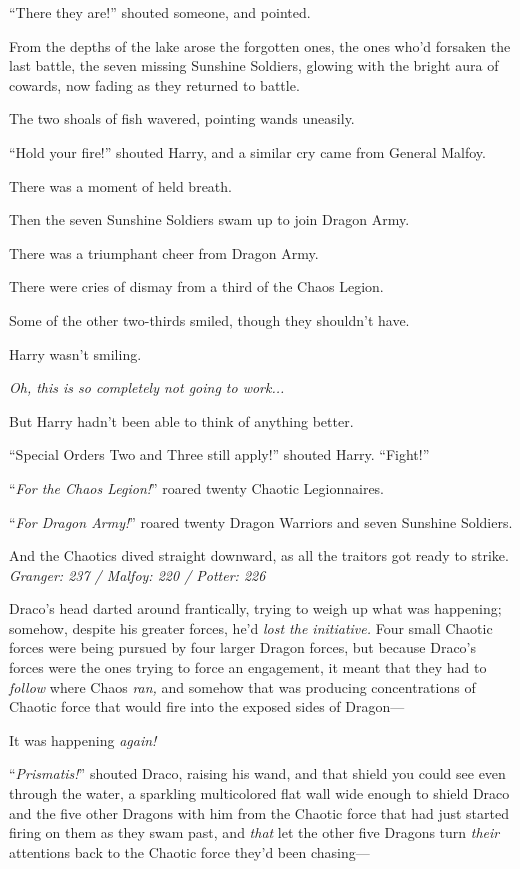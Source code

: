 “There they are!” shouted someone, and pointed.

From the depths of the lake arose the forgotten ones, the ones who’d forsaken the last battle, the seven missing Sunshine Soldiers, glowing with the bright aura of cowards, now fading as they returned to battle.

The two shoals of fish wavered, pointing wands uneasily.

“Hold your fire!” shouted Harry, and a similar cry came from General Malfoy.

There was a moment of held breath.

Then the seven Sunshine Soldiers swam up to join Dragon Army.

There was a triumphant cheer from Dragon Army.

There were cries of dismay from a third of the Chaos Legion.

Some of the other two-thirds smiled, though they shouldn’t have.

Harry wasn’t smiling.

\emph{Oh, this is so completely not going to work...}

But Harry hadn’t been able to think of anything better.

“Special Orders Two and Three still apply!” shouted Harry. “Fight!”

“\emph{For the Chaos Legion!}” roared twenty Chaotic Legionnaires.

“\emph{For Dragon Army!}” roared twenty Dragon Warriors and seven Sunshine Soldiers.

And the Chaotics dived straight downward, as all the traitors got ready to strike.
\sbreak
\emph{Granger: 237 / Malfoy: 220 / Potter: 226}

Draco’s head darted around frantically, trying to weigh up what was happening; somehow, despite his greater forces, he’d \emph{lost the initiative.} Four small Chaotic forces were being pursued by four larger Dragon forces, but because Draco’s forces were the ones trying to force an engagement, it meant that they had to \emph{follow} where Chaos \emph{ran,} and somehow that was producing concentrations of Chaotic force that would fire into the exposed sides of Dragon—

It was happening \emph{again!}

“\emph{Prismatis!}” shouted Draco, raising his wand, and that shield you could see even through the water, a sparkling multicolored flat wall wide enough to shield Draco and the five other Dragons with him from the Chaotic force that had just started firing on them as they swam past, and \emph{that} let the other five Dragons turn \emph{their} attentions back to the Chaotic force they’d been chasing—

